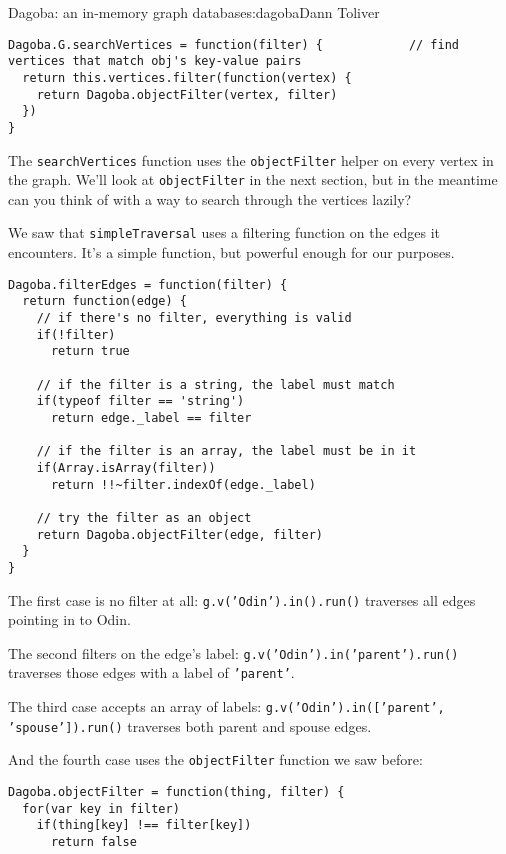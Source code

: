 \begin{aosachapter}{Dagoba: an in-memory graph database}{s:dagoba}{Dann Toliver}
\begin{verbatim}
Dagoba.G.searchVertices = function(filter) {            // find vertices that match obj's key-value pairs
  return this.vertices.filter(function(vertex) {
    return Dagoba.objectFilter(vertex, filter)
  })
}
\end{verbatim}

The \texttt{searchVertices} function uses the \texttt{objectFilter}
helper on every vertex in the graph. We'll look at \texttt{objectFilter}
in the next section, but in the meantime can you think of with a way to
search through the vertices lazily?

\label{filtering}

We saw that \texttt{simpleTraversal} uses a filtering function on the
edges it encounters. It's a simple function, but powerful enough for our
purposes.

\begin{verbatim}
Dagoba.filterEdges = function(filter) {
  return function(edge) {
    // if there's no filter, everything is valid
    if(!filter)                                
      return true
    
    // if the filter is a string, the label must match
    if(typeof filter == 'string')              
      return edge._label == filter
    
    // if the filter is an array, the label must be in it
    if(Array.isArray(filter))                  
      return !!~filter.indexOf(edge._label)

    // try the filter as an object
    return Dagoba.objectFilter(edge, filter)   
  }
}
\end{verbatim}

The first case is no filter at all: \texttt{g.v('Odin').in().run()}
traverses all edges pointing in to Odin.

The second filters on the edge's label:
\texttt{g.v('Odin').in('parent').run()} traverses those edges with a
label of \texttt{'parent'}.

The third case accepts an array of labels:
\texttt{g.v('Odin').in({[}'parent', 'spouse'{]}).run()} traverses both
parent and spouse edges.

And the fourth case uses the \texttt{objectFilter} function we saw
before:

\begin{verbatim}
Dagoba.objectFilter = function(thing, filter) {
  for(var key in filter)
    if(thing[key] !== filter[key])
      return false
  

\end{verbatim}
\end{aosachapter}
